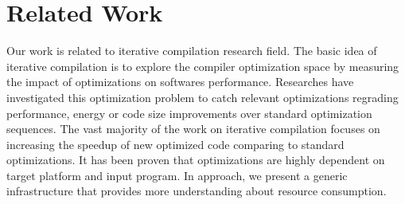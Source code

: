 \section{Related Work}
Our work is related to iterative compilation research field.
The basic idea of iterative compilation is to explore
the compiler optimization space by measuring the impact of optimizations on softwares performance.
Researches have investigated this optimization problem to catch relevant optimizations regrading performance, energy or code size improvements over standard optimization sequences. The vast majority of the work on iterative compilation focuses on increasing the speedup of new optimized code comparing to standard optimizations. It has been proven that optimizations are highly dependent on target platform and input program. In approach, we present a generic infrastructure that provides more understanding about resource consumption.
